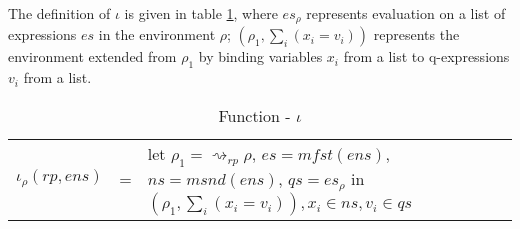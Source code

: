 The definition of $\iota$ is given in table \ref{extension:tab:segEnv}, where $es_\rho$ represents evaluation on a list of expressions $es$ in the environment $\rho$; $(\rho_1, \sum_i(x_i=v_i))$ represents the environment extended from $\rho_1$ by binding variables $x_i$ from a list to q-expressions $v_i$ from a list.
\begin{table}[h]
  \centering
  \begin{tabular}{l l p{6cm}}
    $\iota_\rho(rp, ens)$ & = & let $\rho_1 = \rightsquigarrow_{rp}\rho$, $es = \textit{mfst}(ens)$, $ns = \textit{msnd}(ens)$, $qs = es_\rho$ \newline in $(\rho_1, \sum_i(x_i=v_i)), x_i \in ns, v_i \in qs$
  \end{tabular}
  \caption{Function - $\iota$}
  \label{extension:tab:segEnv}
\end{table}

